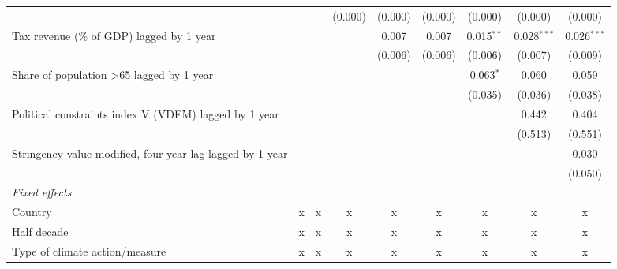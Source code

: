 \begin{tabular}{lcccccccc}
                                                                                &         &         & (0.000) & (0.000)     & (0.000)     & (0.000)       & (0.000)       & (0.000)\\   
   Tax revenue (\% of GDP) lagged by 1 year                                     &         &         &         & 0.007       & 0.007       & 0.015$^{**}$  & 0.028$^{***}$ & 0.026$^{***}$\\   
                                                                                &         &         &         & (0.006)     & (0.006)     & (0.006)       & (0.007)       & (0.009)\\   
   Share of population >65 lagged by 1 year                                     &         &         &         &             &             & 0.063$^{*}$   & 0.060         & 0.059\\   
                                                                                &         &         &         &             &             & (0.035)       & (0.036)       & (0.038)\\   
   Political constraints index V (VDEM) lagged by 1 year                        &         &         &         &             &             &               & 0.442         & 0.404\\   
                                                                                &         &         &         &             &             &               & (0.513)       & (0.551)\\   
   Stringency value modified, four-year lag lagged by 1 year                    &         &         &         &             &             &               &               & 0.030\\   
                                                                                &         &         &         &             &             &               &               & (0.050)\\   
   \emph{Fixed effects}\\
   Country                                                                      & x       & x       & x       & x           & x           & x             & x             & x\\  
   Half decade                                                                  & x       & x       & x       & x           & x           & x             & x             & x\\  
   Type of climate action/measure                                               & x       & x       & x       & x           & x           & x             & x             & x\\  

\end{tabular}
